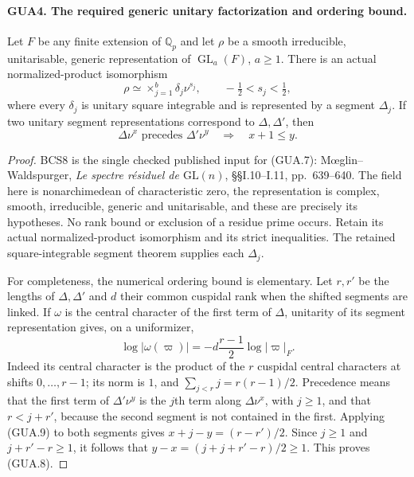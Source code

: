 \documentclass[11pt,a4paper]{article}
\numberwithin{equation}{section}
\theoremstyle{remark}\newtheorem{remark}[theorem]{Remark}
\begin{document}
\paragraph{GUA4. The required generic unitary factorization and ordering bound.}
\label{claim:GUA4}
Let $F$ be any finite extension of $\mathbb Q_p$ and let
$\rho$ be a smooth irreducible, unitarisable, generic
representation of $\operatorname{GL}_a(F)$, $a\geq1$.
There is an actual normalized-product isomorphism
\[
       \rho\simeq\mathop{\times}_{j=1}^b\delta_j\nu^{s_j},
       \qquad -\tfrac12<s_j<\tfrac12,                 \tag{GUA.7}
\]
where every $\delta_j$ is unitary square integrable and is
represented by a segment $\Delta_j$.  If two unitary
segment representations correspond to $\Delta,\Delta'$,
then
\[
            \Delta\nu^x\text{ precedes }\Delta'\nu^y
                       \quad\Longrightarrow\quad x+1\leq y.
                                                        \tag{GUA.8}
\]
\begin{proof}
BCS8 is the single checked published input for (GUA.7):
M\oe glin--Waldspurger, \emph{Le spectre r\'esiduel de
$\mathrm{GL}(n)$}, \S\S I.10--I.11, pp.~639--640.
The field here is nonarchimedean of characteristic zero,
the representation is complex, smooth, irreducible,
generic and unitarisable, and these are precisely its
hypotheses.  No rank bound or exclusion of a residue
prime occurs.  Retain its actual normalized-product
isomorphism and its strict inequalities.  The retained
square-integrable segment theorem supplies each $\Delta_j$.

For completeness, the numerical ordering bound is elementary.
Let $r,r'$ be the lengths of $\Delta,\Delta'$ and $d$ their
common cuspidal rank when the shifted segments are linked.
If $\omega$ is the central character of the first term of
$\Delta$, unitarity of its segment representation gives,
on a uniformizer,
\[
 \log|\omega(\varpi)|
          =-d\frac{r-1}{2}\log|\varpi|_F.            \tag{GUA.9}
\]
Indeed its central character is the product of the $r$
cuspidal central characters at shifts $0,\ldots,r-1$;
its norm is $1$, and $\sum_{j<r}j=r(r-1)/2$.
Precedence means that the first term of
$\Delta'\nu^y$ is the $j$th term along $\Delta\nu^x$,
with $j\geq1$, and that $r<j+r'$, because the second
segment is not contained in the first.  Applying (GUA.9)
to both segments gives
$x+j-y=(r-r')/2$.  Since $j\geq1$ and
$j+r'-r\geq1$, it follows that
$y-x=(j+j+r'-r)/2\geq1$.  This proves (GUA.8).
\end{proof}
\end{document}
